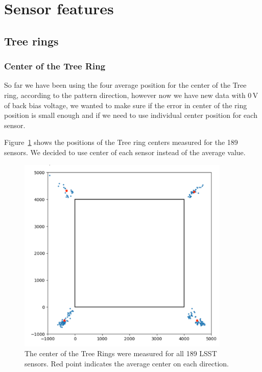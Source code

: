 \section{Sensor features}\label{sensor-features}

\subsection{Tree rings}\label{tree-rings}
\subsubsection{Center of the Tree Ring}
So far we have been using the four average position for the center of the Tree ring, according to the pattern direction, however now we have new data with 0\,V of back bias voltage, we wanted to make sure if the error in center of the ring position is small enough and if we need to use individual center position for each sensor. 

Figure~\ref{fig:tree_ring_center} shows the positions of the Tree ring centers measured for the 189 sensors. We decided to use center of each sensor instead of the average value. 

\begin{figure}
\begin{centering}
\includegraphics[width=0.9\textwidth]{sections/figures/TR_centers.png}
\end{centering}
\caption{The center of the Tree Rings were measured for all 189 LSST sensors. Red point indicates the average center on each direction.}
\label{fig:tree_ring_center}
\end{figure}

